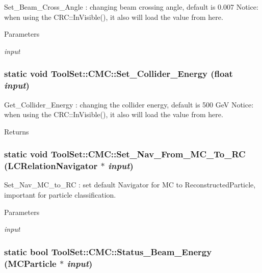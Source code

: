Set\_\-Beam\_\-Cross\_\-Angle : changing beam crossing angle, default is 0.007 Notice: when using the CRC::InVisible(), it also will load the value from here. 
\begin{DoxyParams}{Parameters}
\item[{\em input}]\end{DoxyParams}
\hypertarget{classToolSet_1_1CMC_a2b939b1fd1e396eb5764c512903fe229}{
\subsubsection[{Set\_\-Collider\_\-Energy}]{\setlength{\rightskip}{0pt plus 5cm}static void ToolSet::CMC::Set\_\-Collider\_\-Energy (float {\em input})}}
\label{classToolSet_1_1CMC_a2b939b1fd1e396eb5764c512903fe229}


Get\_\-Collider\_\-Energy : changing the collider energy, default is 500 GeV Notice: when using the CRC::InVisible(), it also will load the value from here. \begin{DoxyReturn}{Returns}

\end{DoxyReturn}
\hypertarget{classToolSet_1_1CMC_ab933f8f5cbebde554dcce60f086bf480}{
\subsubsection[{Set\_\-Nav\_\-From\_\-MC\_\-To\_\-RC}]{\setlength{\rightskip}{0pt plus 5cm}static void ToolSet::CMC::Set\_\-Nav\_\-From\_\-MC\_\-To\_\-RC (LCRelationNavigator $\ast$ {\em input})}}
\label{classToolSet_1_1CMC_ab933f8f5cbebde554dcce60f086bf480}


Set\_\-Nav\_\-MC\_\-to\_\-RC : set default Navigator for MC to ReconstructedParticle, important for particle classification. 
\begin{DoxyParams}{Parameters}
\item[{\em input}]\end{DoxyParams}
\hypertarget{classToolSet_1_1CMC_a3ebc24c0c160ba37054b294059f09d96}{
\subsubsection[{Status\_\-Beam\_\-Energy}]{\setlength{\rightskip}{0pt plus 5cm}static bool ToolSet::CMC::Status\_\-Beam\_\-Energy (MCParticle $\ast$ {\em input})}}
\label{classToolSet_1_1CMC_a3ebc24c0c160ba37054b294059f09d96}


